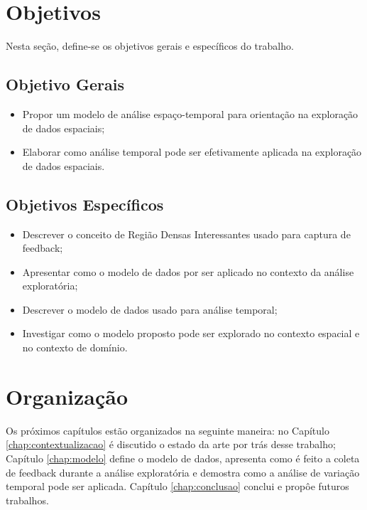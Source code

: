 \section{Objetivos}

Nesta seção, define-se os objetivos gerais e específicos do trabalho.

\subsection{Objetivo Gerais}

\begin{itemize}
	\item Propor um modelo de análise espaço-temporal para orientação na exploração de dados espaciais;
	\item Elaborar como análise temporal pode ser efetivamente aplicada na exploração de dados espaciais.
\end{itemize}

\subsection{Objetivos Específicos}

\begin{itemize}
	\item Descrever o conceito de Região Densas Interessantes usado para captura de feedback;
	\item Apresentar como o modelo de dados por ser aplicado no contexto da análise exploratória;
	\item Descrever o modelo de dados usado para análise temporal;
	\item Investigar como o modelo proposto pode ser explorado no contexto espacial e no contexto de domínio.
\end{itemize}

\section{Organização}

Os próximos capítulos estão organizados na seguinte maneira: no Capítulo \ref{chap:contextualizacao} é discutido o estado da arte por trás desse trabalho; Capítulo \ref{chap:modelo} define o modelo de dados, apresenta como é feito a coleta de feedback durante a análise exploratória e demostra como a análise de variação temporal pode ser aplicada. Capítulo \ref{chap:conclusao} conclui e propôe futuros trabalhos.
